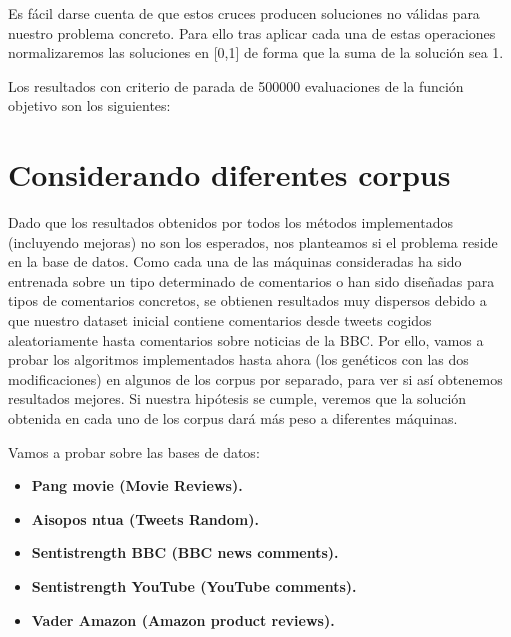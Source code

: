 \documentclass{article}
\begin{document}
Es fácil darse cuenta de que estos cruces producen soluciones no válidas para nuestro problema concreto. Para ello tras aplicar cada una de estas operaciones normalizaremos las soluciones en [0,1] de forma que la suma de la solución sea 1.

Los resultados con criterio de parada de 500000 evaluaciones de la función objetivo son los siguientes:
\begin{table}[H]
	\begin{center}
		\caption{Algoritmos meméticos}
		\label{tabla:a5}
	\end{center}
\end{table}

\section{Considerando diferentes corpus}
Dado que los resultados obtenidos por todos los métodos implementados (incluyendo mejoras) no son los esperados, nos planteamos si el problema reside en la base de datos. Como cada una de las máquinas consideradas ha sido entrenada sobre un tipo determinado de comentarios o han sido diseñadas para tipos de comentarios concretos, se obtienen resultados muy dispersos debido a que nuestro dataset inicial contiene comentarios desde tweets cogidos aleatoriamente hasta comentarios sobre noticias de la BBC. Por ello, vamos a probar los algoritmos implementados hasta ahora (los genéticos con las dos modificaciones) en algunos de los corpus por separado, para ver si así obtenemos resultados mejores. Si nuestra hipótesis se cumple, veremos que la solución obtenida en cada uno de los corpus dará más peso a diferentes máquinas.

Vamos a probar sobre las bases de datos:
\begin{itemize}
	\item \textbf{Pang movie (Movie Reviews).}
	\item \textbf{Aisopos ntua (Tweets Random).}
	\item \textbf{Sentistrength BBC (BBC news comments). }
	\item \textbf{Sentistrength YouTube (YouTube comments). }
	\item \textbf{Vader Amazon (Amazon product reviews). } 
\end{itemize}
\end{document}
